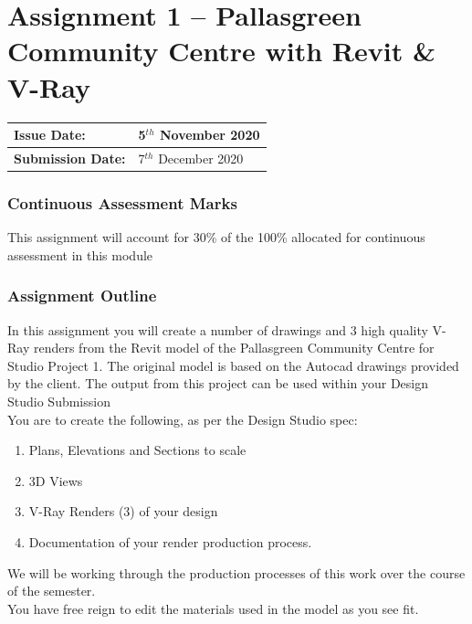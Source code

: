 
	
\part*{Assignment 1 – Pallasgreen Community Centre with  Revit \& V-Ray }

\begin{tabularx}{\textwidth}{ |X|X| }
	\hline
	\textbf{Issue Date:} & 5$^{th}$ November 2020 \\
	\hline 
	\textbf{Submission Date:}  & 7$^{th}$ December 2020  \\
	\hline
\end{tabularx}


\section*{Continuous Assessment Marks}
This assignment will account for 30\% of the 100\% allocated for continuous assessment in this module

\section*{Assignment Outline}
In this assignment you will create a number of drawings and 3 high quality V-Ray renders from the Revit model of the Pallasgreen Community Centre for Studio Project 1.  The original model is based on the Autocad drawings provided by the client.  The output from this project can be used within your Design Studio Submission\\

You are to create the following, as per the Design Studio spec:

\begin{enumerate}
	\item Plans, Elevations and Sections to scale
	\item 3D Views
	\item V-Ray Renders (3) of your design
	\item Documentation of your render production process.
\end{enumerate}

We will be working through the production processes of this work over the course of the semester.\\

You have free reign to edit the materials used in the model as you see fit.\\


\newpage


